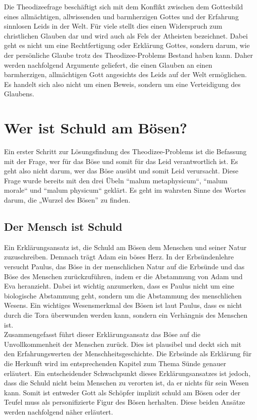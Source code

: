 Die Theodizeefrage beschäftigt sich mit dem Konflikt zwischen dem Gottesbild eines allmächtigen, allwissenden und barmherzigen Gottes und der Erfahrung sinnlosen Leids in der Welt. Für viele stellt dies einen Widerspruch zum christlichen Glauben dar und wird auch als \glqq Fels der Atheisten\grqq{} bezeichnet. Dabei geht es nicht um eine Rechtfertigung oder Erklärung Gottes, sondern darum, wie der persönliche Glaube trotz des Theodizee-Problems Bestand haben kann. Daher werden nachfolgend Argumente geliefert, die einen Glauben an einen barmherzigen, allmächtigen Gott angesichts des Leids auf der Welt ermöglichen. Es handelt sich also nicht um einen Beweis, sondern um eine Verteidigung des Glaubens.\\

\section{Wer ist Schuld am Bösen?}
Ein erster Schritt zur Lösungsfindung des Theodizee-Problems ist die Befassung mit der Frage, wer für das Böse und somit für das Leid verantwortlich ist. Es geht also nicht darum, wer das Böse ausübt und somit Leid verursacht. Diese Frage wurde bereits mit den drei Übeln ``malum metaphysicum``, ``malum morale`` und ``malum physicum`` geklärt. Es geht im wahrsten Sinne des Wortes darum, die „Wurzel des Bösen” zu finden.

\subsection{Der Mensch ist Schuld}
Ein Erklärungsansatz ist, die Schuld am Bösen dem Menschen und seiner Natur zuzuschreiben. Demnach trägt Adam ein böses Herz. In der Erbsündenlehre versucht Paulus, das Böse in der menschlichen Natur auf die Erbsünde und das Böse des Menschen zurückzuführen, indem er die Abstammung von Adam und Eva heranzieht. Dabei ist wichtig anzumerken, dass es Paulus nicht um eine biologische Abstammung geht, sondern um die Abstammung des menschlichen Wesens. Ein wichtiges Wesensmerkmal des Bösen ist laut Paulus, dass es nicht durch die Tora überwunden werden kann, sondern ein Verhängnis des Menschen ist. \\

Zusammengefasst führt dieser Erklärungsansatz das Böse auf die Unvollkommenheit der Menschen zurück. Dies ist plausibel und deckt sich mit den Erfahrungswerten der Menschheitsgeschichte. Die Erbsünde als Erklärung für die Herkunft wird im entsprechenden Kapitel zum Thema Sünde genauer erläutert. Ein entscheidender Schwachpunkt dieses Erklärungsansatzes ist jedoch, dass die Schuld nicht beim Menschen zu verorten ist, da er nichts für sein Wesen kann. Somit ist entweder Gott als Schöpfer implizit schuld am Bösen oder der Teufel muss als personifizierte Figur des Bösen herhalten. Diese beiden Ansätze werden nachfolgend näher erläutert.

